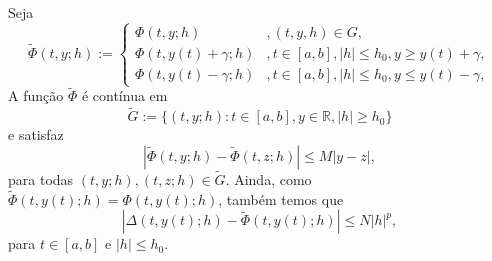 \begin{dem}
  Seja
  \begin{equation}
    \tilde{\Phi}(t, y; h) := \left\{
      \begin{array}{ll}
        \Phi(t, y; h) &, (t, y, h)\in G,\\
        \Phi(t, y(t)+\gamma; h) &, t\in [a, b], |h|\leq h_0, y\geq y(t)+\gamma,\\
        \Phi(t, y(t)-\gamma; h) &, t\in [a, b], |h|\leq h_0, y\leq y(t)-\gamma,
      \end{array}
    \right.
  \end{equation}
  A função $\tilde{\Phi}$ é contínua em
  \begin{equation}
    \tilde{G} := \{(t, y; h): t\in [a, b], y\in\mathbb{R}, |h|\geq h_0\}
  \end{equation}
  e satisfaz
  \begin{equation}\label{cap_pvi_sec_taylor:eq:aux0}
    \left|\tilde{\Phi}(t, y; h) - \tilde{\Phi}(t, z; h)\right| \leq M|y - z|,
  \end{equation}
  para todas $(t, y; h), (t, z; h)\in \tilde{G}$. Ainda, como $\tilde{\Phi}(t, y(t); h) = \Phi(t, y(t); h)$, também temos que
  \begin{equation}\label{cap_pvi_sec_taylor:eq:aux1}
    |\Delta(t, y(t); h) - \tilde{\Phi}(t, y(t); h)| \leq N |h|^p,
  \end{equation}
  para $t\in [a, b]$ e $|h|\leq h_0$.


\end{dem}
